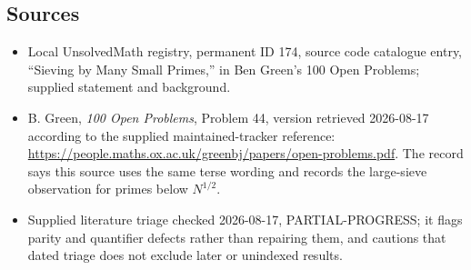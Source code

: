 \documentclass[11pt]{article}
\begin{document}
\subsection{Sources}
\begin{itemize}
\item Local UnsolvedMath registry, permanent ID 174, source code catalogue entry, ``Sieving by Many Small Primes,'' in Ben Green's 100 Open Problems; supplied statement and background.
\item B. Green, \emph{100 Open Problems}, Problem 44, version retrieved 2026-08-17 according to the supplied maintained-tracker reference: \url{https://people.maths.ox.ac.uk/greenbj/papers/open-problems.pdf}. The record says this source uses the same terse wording and records the large-sieve observation for primes below $N^{1/2}$.
\item Supplied literature triage checked 2026-08-17, PARTIAL-PROGRESS; it flags parity and quantifier defects rather than repairing them, and cautions that dated triage does not exclude later or unindexed results.
\end{itemize}
\end{document}
